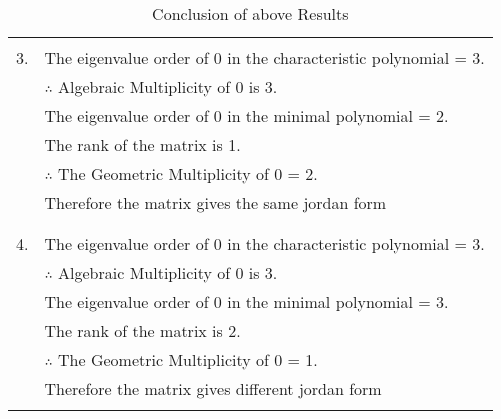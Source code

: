 \begin{longtable}{|c|l|}
	&\\
	3.&The eigenvalue order of 0 in the characteristic polynomial = 3.\\
	&$\therefore$ Algebraic Multiplicity of 0 is 3.\\
	&The eigenvalue order of 0 in the minimal polynomial = 2.\\
    &The rank of the matrix is 1.\\
    &$\therefore$ The Geometric Multiplicity of 0 = 2.\\
    &Therefore the matrix gives the same jordan form\\
	& \\
	\hline
	&\\
	4.&The eigenvalue order of 0 in the characteristic polynomial = 3.\\
	&$\therefore$ Algebraic Multiplicity of 0 is 3.\\
	&The eigenvalue order of 0 in the minimal polynomial = 3.\\
    &The rank of the matrix is 2.\\
    &$\therefore$ The Geometric Multiplicity of 0 = 1.\\
    &Therefore the matrix gives different jordan form\\
	\hline
	\caption{Conclusion of above Results}
    \label{eq:solutions/2014/dec/71/table:3}
\end{longtable}

\twocolumn
